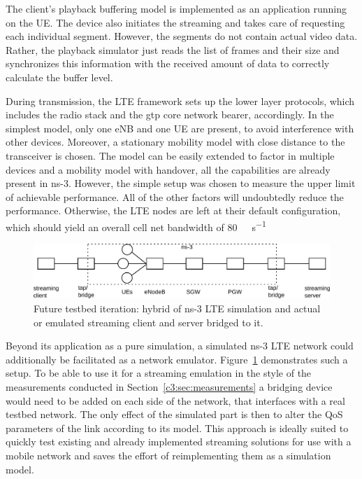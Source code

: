 The client's playback buffering model is implemented as an application running on the \gls{UE}. The device also initiates the streaming and takes care of requesting each individual segment. However, the segments do not contain actual video data. Rather, the playback simulator just reads the list of frames and their size and synchronizes this information with the received amount of data to correctly calculate the buffer level.

During transmission, the \gls{LTE} framework sets up the lower layer protocols, which includes the radio stack and the \gls{gtp} core network bearer, accordingly. In the simplest model, only one \gls{eNB} and one \gls{UE} are present, to avoid interference with other devices. Moreover, a stationary mobility model with close distance to the transceiver is chosen. The model can be easily extended to factor in multiple devices and a mobility model with handover, all the capabilities are already present in ns-3. However, the simple setup was chosen to measure the upper limit of achievable performance. All of the other factors will undoubtedly reduce the performance. Otherwise, the \gls{LTE} nodes are left at their default configuration, which should yield an overall cell net bandwidth of \SI{80}{\mega\bit\per\second}

\begin{figure}[htb]
	\centering
	\includegraphics[width=1.0\textwidth]{images/streaming-hybrid.pdf}
	\caption{Future testbed iteration: hybrid of ns-3 LTE simulation and actual or emulated streaming client and server bridged to it.}
\label{c6:fig:streaming-hybrid}
\end{figure}

Beyond its application as a pure simulation, a simulated ns-3 \gls{LTE} network could additionally be facilitated as a network emulator. Figure~\ref{c6:fig:streaming-hybrid} demonstrates such a setup. To be able to use it for a streaming emulation in the style of the measurements conducted in Section~\ref{c3:sec:measurements} a bridging device would need to be added on each side of the network, that interfaces with a real testbed network. The only effect of the simulated part is then to alter the \gls{QoS} parameters of the link according to its model. This approach is ideally suited to quickly test existing and already implemented streaming solutions for use with a mobile network and saves the effort of reimplementing them as a simulation model.


